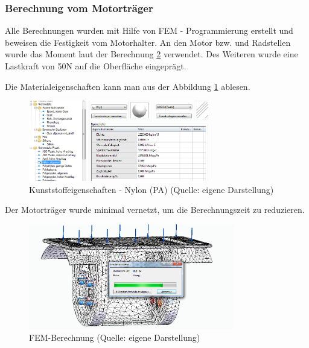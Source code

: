 \subsubsection{ Berechnung vom Motorträger}
Alle Berechnungen wurden mit Hilfe von FEM - Programmierung erstellt und beweisen die Festigkeit vom Motorhalter. An den  Motor bzw. und Radstellen wurde das Moment laut der Berechnung \ref{FEM1} verwendet. Des Weiteren wurde eine Lastkraft von 50N auf die Oberfläche eingeprägt.

Die Materialeigenschaften kann man aus der Abbildung \ref{FEM2} ablesen.
\pagebreak
\begin{figure}[!h]  %
	\centering\includegraphics[width=0.7\textwidth]{images/FEM2.png}
	\caption{Kunststoffeigenschaften - Nylon (PA) \newline (Quelle: eigene Darstellung)}
	\label{FEM2} %
\end{figure}

Der Motorträger wurde minimal vernetzt, um die Berechnungszeit zu reduzieren.

\begin{figure}[!h] 
	\centering\includegraphics[width=0.8\textwidth]{images/FEM.png}
	\caption{FEM-Berechnung \newline (Quelle: eigene Darstellung)}
	\label{FEM1} %
\end{figure}

